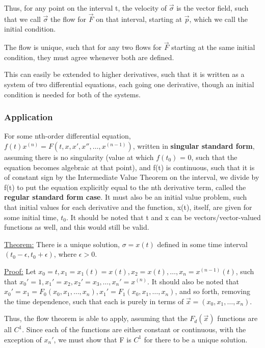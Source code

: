 \documentclass[11 pt, twoside]{article}
\begin{document}
Thus, for any point on the interval t, the velocity of $\vec{\sigma}$ is the vector field, such that we call $\vec{\sigma}$ the flow for $\vec{F}$ on that interval, starting at $\vec{p}$, which we call the initial condition.

The flow is unique, such that for any two flows for $\vec{F}$ starting at the same initial condition, they must agree whenever both are defined.

This can easily be extended to higher derivatives, such that it is written as a system of two differential equations, each going one derivative, though an initial condition is needed for both of the systems.

\subsubsection{Application}
For some nth-order differential equation, $f(t)x^{(n)} = F(t, x, x', x'', \dots, x^{(n-1)})$, written in \textbf{singular standard form}, assuming there is no singularity (value at which $f(t_0)$ = 0, such that the equation becomes algebraic at that point), and f(t) is continuous, such that it is of constant sign by the Intermediate Value Theorem on the interval, we divide by f(t) to put the equation explicitly equal to the nth derivative term, called the \textbf{regular standard form case}. It must also be an initial value problem, such that initial values for each derivative and the function, x(t), itself, are given for some initial time, $t_0$. It should be noted that t and x can be vectors/vector-valued functions as well, and this would still be valid.

\underline{Theorem:} There is a unique solution, $\sigma = x(t)$ defined in some time interval $(t_0 - \epsilon, t_0 + \epsilon)$, where $\epsilon > 0$.

\underline{Proof:}
Let $x_0 = t, x_1 = x_1(t) = x(t), x_2 = x(t), \dots, x_n = x^{(n-1)}(t)$, such that $x_0' = 1, x_1' = x_2, x_2' = x_3, \dots, x_n' = x^{(n)}$. It should also be noted that $x_0' = x_1 = F_0(x_0, x_1, \dots, x_n), x_1' = F_1(x_0, x_1, \dots, x_n)$, and so forth, removing the time dependence, such that each is purely in terms of $\vec{x} = (x_0, x_1, \dots, x_n)$. 

Thus, the flow theorem is able to apply, assuming that the $F_d(\vec{x})$ functions are all $C^1$. Since each of the functions are either constant or continuous, with the exception of $x_n'$, we must show that F is $C^1$ for there to be a unique solution.
\end{document}
